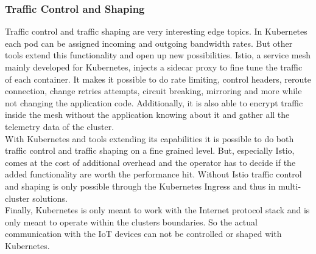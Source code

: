 \subsubsection{Traffic Control and Shaping}
Traffic control and traffic shaping are very interesting edge topics. In Kubernetes each pod can be assigned incoming and outgoing bandwidth rates. But other tools extend this functionality and open up new possibilities. Istio, a service mesh mainly developed for Kubernetes, injects a sidecar proxy to fine tune the traffic of each container. It makes it possible to do rate limiting, control headers, reroute connection, change retries attempts, circuit breaking, mirroring and more while not changing the application code. Additionally, it is also able to encrypt traffic inside the mesh without the application knowing about it and gather all the telemetry data of the cluster. \\
With Kubernetes and tools extending its capabilities it is possible to do both traffic control and traffic shaping on a fine grained level. But, especially Istio, comes at the cost of additional overhead and the operator has to decide if the added functionality are worth the performance hit. Without Istio traffic control and shaping is only possible through the Kubernetes Ingress and thus in multi-cluster solutions.\\
Finally, Kubernetes is only meant to work with the Internet protocol stack and is only meant to operate within the clusters boundaries. So the actual communication with the IoT devices can not be controlled or shaped with Kubernetes. 